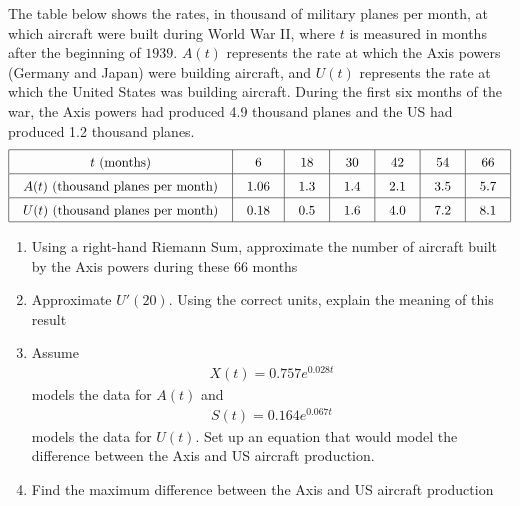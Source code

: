 The table below shows the rates, in thousand of military planes per month, at which aircraft were built during World War II, where $t$ is measured in months after the beginning of $1939$. $A(t)$ represents the rate at which the Axis powers (Germany and Japan) were building aircraft, and $U(t)$ represents the rate at which the United States was building aircraft. During the first six months of the war, the Axis powers had produced 4.9 thousand planes and the US had produced 1.2 thousand planes. \begin{align*}
    \arraycolsep=11pt\def\arraystretch{1.5}
    \begin{array}{|c|c|c|c|c|c|c|}
        \hline
        t \text{ (months)} & 6 & 18 & 30 & 42 & 54 & 66 \\ \hline
        A(t) \text{ (thousand planes per month)} & 1.06 & 1.3 & 1.4 & 2.1 & 3.5 & 5.7 \\ \hline
        U(t) \text{ (thousand planes per month)} & 0.18 & 0.5 & 1.6 & 4.0 & 7.2 & 8.1 \\
        \hline
    \end{array}
\end{align*}
\begin{enumerate}[label=\hspace{11pt}(\alph*), align=left, leftmargin=*, labelsep=0.25em]
    \item Using a right-hand Riemann Sum, approximate the number of aircraft built by the Axis powers during these 66 months
    \item Approximate $U'(20)$. Using the correct units, explain the meaning of this result
    \item Assume \begin{align*}
        X(t) = 0.757e^{0.028t}
    \end{align*}
    models the data for $A(t)$ and \begin{align*}
        S(t) = 0.164e^{0.067t}
    \end{align*}
    models the data for $U(t)$. Set up an equation that would model the difference between the Axis and US aircraft production.
    \item Find the maximum difference between the Axis and US aircraft production
\end{enumerate}

